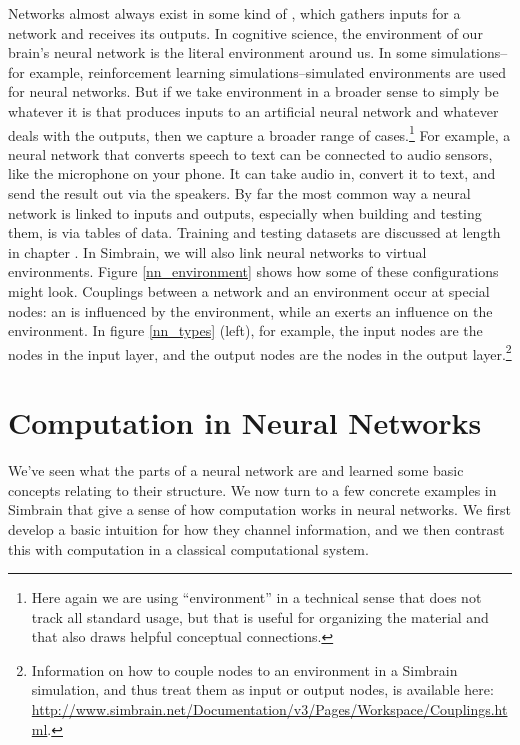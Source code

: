 Networks almost always exist in some kind of  , which gathers inputs for a network and receives its outputs. In cognitive science, the environment of our brain's neural network is the literal environment around us. In some simulations--for example, reinforcement learning simulations--simulated environments are used for neural networks. But if we take environment in a broader sense to simply be whatever it is that produces inputs to an artificial neural network and whatever deals with the outputs, then we capture a broader range of cases.\footnote{Here again we are using ``environment'' in a technical sense that does not track all standard usage, but that is useful for organizing the material and that also draws helpful conceptual connections.}  For example, a neural network that converts speech to text can be connected to audio sensors, like the microphone on your phone. It can take audio in, convert it to text, and send the result out via the speakers. By far the most common way a neural network is linked to inputs and outputs, especially when building and testing them, is via tables of data. Training and testing datasets are discussed at length in chapter . In Simbrain, we will also link neural networks to virtual environments. Figure \ref{nn_environment} shows how some of these configurations might look. Couplings between a network and an environment occur at special nodes:  an   is influenced by the environment, while an   exerts an influence on the environment. In figure \ref{nn_types} (left), for example, the input nodes are the nodes in the input layer, and the output nodes are the nodes in the output layer.\footnote{Information on how to couple nodes to an environment in a Simbrain simulation, and thus treat them as input or output nodes, is available here: \url{http://www.simbrain.net/Documentation/v3/Pages/Workspace/Couplings.html}.} 

\section{Computation in Neural Networks}\label{intro_comp_nn}

We've seen what the parts of a neural network are and learned some basic concepts relating to their structure. We now turn to a few concrete examples in Simbrain that give a sense of how computation works in neural networks. We first develop a basic intuition for how they channel information, and we then contrast this with computation in a classical computational system.

